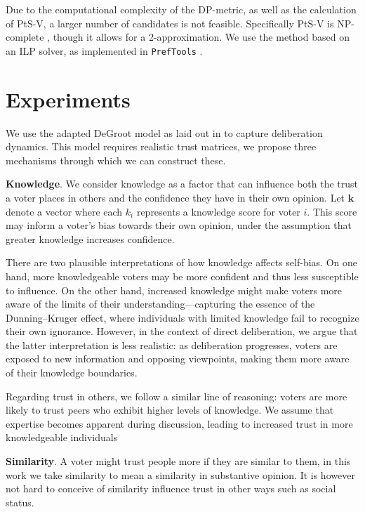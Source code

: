 Due to the computational complexity of the
DP-metric, as well as the calculation of PtS-V, a larger number of candidates is not
feasible. Specifically PtS-V is NP-complete
\cite{erdelyiComputationalAspectsNearly2013}, though it allows for a
2-approximation. We use the method based on an ILP solver, as implemented in
\texttt{PrefTools} \cite{PrefLibPreflibtools2025}.



\section{Experiments}
We use the adapted DeGroot model as laid out in  to capture deliberation dynamics. This model requires realistic trust matrices, we propose three mechanisms through which we can construct these.


\textbf{Knowledge}. We consider knowledge as a factor that can influence both the trust a voter places in others and the confidence they have in their own opinion. Let $\boldsymbol{k}$ denote a vector where each $k_i$ represents a knowledge score for voter $i$. This score may inform a voter's bias towards their own opinion, under the assumption that greater knowledge increases confidence.

There are two plausible interpretations of how knowledge affects self-bias. On one hand, more knowledgeable voters may be more confident and thus less susceptible to influence. On the other hand, increased knowledge might make voters more aware of the limits of their understanding—capturing the essence of the Dunning–Kruger effect, where individuals with limited knowledge fail to recognize their own ignorance. However, in the context of direct deliberation, we argue that the latter interpretation is less realistic: as deliberation progresses, voters are exposed to new information and opposing viewpoints, making them more aware of their knowledge boundaries.

Regarding trust in others, we follow a similar line of reasoning: voters are
more likely to trust peers who exhibit higher levels of knowledge. We assume
that expertise becomes apparent during discussion, leading to increased
trust in more knowledgeable individuals


\textbf{Similarity}. A voter might trust people more if they are similar to them, in this work we take similarity to mean a similarity in substantive opinion. It is however not hard to conceive of similarity influence trust in other ways such as social status.


